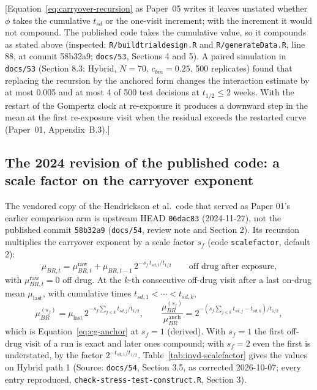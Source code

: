 \documentclass[11pt]{article}
\newcommand{\note}[1]{\textcolor{blue!60!black}{\small [#1]}}
\newcommand{\code}[1]{\texttt{#1}}
\begin{document}
\note{Equation~\eqref{eq:carryover-recursion} as Paper~05 writes it
leaves unstated whether $\phi$ takes the cumulative $t_{sd}$ or the
one-visit increment; with the increment it would not compound. The
published code takes the cumulative value, so it compounds as stated
above (inspected: \code{R/buildtrialdesign.R} and
\code{R/generateData.R}, line 88, at commit 58b32a9; \code{docs/53},
Sections 4 and 5). A paired simulation in \code{docs/53} (Section 8.3;
Hybrid, $N = 70$, $c_{bm} = 0.25$, 500 replicates) found that replacing
the recursion by the anchored form changes the interaction estimate by
at most 0.005 and at most 4 of 500 test decisions at
$t_{1/2} \le 2$ weeks. With the restart of the Gompertz clock at re-exposure it produces
a downward step in the mean at the first re-exposure visit when the
residual exceeds the restarted curve (Paper~01, Appendix~B.3).}

\subsection{The 2024 revision of the published code: a scale factor on
the carryover exponent}
\label{sec:invd-scalefactor}

The vendored copy of the Hendrickson et al.\ code that served as Paper
01's earlier comparison arm is upstream HEAD \code{06dac83}
(2024-11-27), not the published commit \code{58b32a9}
(\code{docs/54}, review note and Section 2).
Its recursion multiplies the carryover exponent by a scale factor
$s_f$ (code \code{scalefactor}, default 2):
\begin{equation}
\mu_{BR,t} = \mu^{\mathrm{raw}}_{BR,t} + \mu_{BR,t-1}\,
  2^{-s_f\, t_{sd,t}/t_{1/2}}
\qquad \text{off drug after exposure,}
\label{eq:invd-scalefactor}
\end{equation}
with $\mu^{\mathrm{raw}}_{BR,t} = 0$ off drug. At the $k$-th consecutive
off-drug visit after a last on-drug mean $\mu_{\mathrm{last}}$, with
cumulative times $t_{sd,1} < \cdots < t_{sd,k}$,
\begin{equation}
\mu_{BR}^{(s_f)} = \mu_{\mathrm{last}}\,
  2^{-s_f\sum_{j \le k} t_{sd,j}/t_{1/2}},
\qquad
\frac{\mu_{BR}^{(s_f)}}{\mu_{BR}^{\mathrm{anch}}} =
  2^{-\left(s_f \sum_{j\le k} t_{sd,j} - t_{sd,k}\right)/t_{1/2}},
\label{eq:invd-scalefactor-ratio}
\end{equation}
which is Equation~\eqref{eq:cg-anchor} at $s_f = 1$ (derived). With
$s_f = 1$ the first off-drug visit of a run is exact and later ones
compound; with $s_f = 2$ even the first is understated, by the factor
$2^{-t_{sd,1}/t_{1/2}}$. Table~\ref{tab:invd-scalefactor} gives the
values on Hybrid path 1 (Source: \code{docs/54},
Section 3.5, as corrected 2026-10-07; every entry reproduced,
\code{check-stress-test-construct.R}, Section 3).
\end{document}
